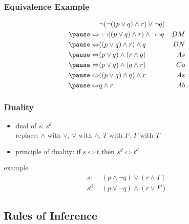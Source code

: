\documentclass[dvipsnames]{beamer}
\begin{document}
\begin{frame}
  \frametitle{Equivalence Example}

  \begin{eqnarray*}
                    & \neg (\neg ((p \vee q) \wedge r) \vee \neg q)      &   \\
    \pause
    \Leftrightarrow & \neg \neg ((p \vee q) \wedge r) \wedge \neg \neg q & DM\\
    \pause
    \Leftrightarrow & ((p \vee q) \wedge r) \wedge q                     & DN\\
    \pause
    \Leftrightarrow & (p \vee q) \wedge (r \wedge q)                     & As\\
    \pause
    \Leftrightarrow & (p \vee q) \wedge (q \wedge r)                     & Co\\
    \pause
    \Leftrightarrow & ((p \vee q) \wedge q) \wedge r                     & As\\
    \pause
    \Leftrightarrow & q \wedge r                                         & Ab
  \end{eqnarray*}
\end{frame}

\begin{frame}
  \frametitle{Duality}

  \begin{itemize}
    \item \alert{dual} of $s$: $s^d$\\
      replace: $\wedge$ with $\vee$, $\vee$ with $\wedge$, $T$ with $F$, $F$ with $T$

    \pause
    \medskip
    \item \alert{principle of duality}:
      if $s \Leftrightarrow t$ then $s^d \Leftrightarrow t^d$
  \end{itemize}

  \pause
  \begin{exampleblock}{example}
    \begin{eqnarray*}
      s:   & (p \wedge \neg q) \vee (r \wedge T)\\
      s^d: & (p \vee \neg q) \wedge (r \vee F)
    \end{eqnarray*}
  \end{exampleblock}
\end{frame}

\subsection{Rules of Inference}
\end{document}
